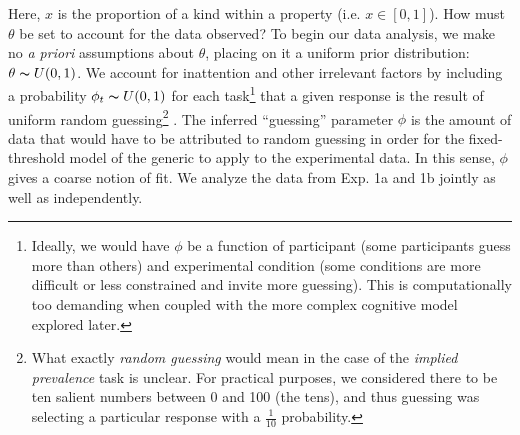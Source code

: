 \documentclass[10pt,letterpaper]{article}
\begin{document}



Here, $x$ is the proportion of a kind within a property (i.e. $x \in [0,1]$). How must $\theta$ be set to account for the data observed? 
To begin our data analysis, we make no \emph{a priori} assumptions about $\theta$, placing on it a uniform prior distribution: $\theta \thicksim U(0,1)$. 
We account for inattention and other irrelevant factors by including a probability $\phi_{t}\thicksim U(0,1)$ for each task\footnote{Ideally, we would have $\phi$ be a function of participant (some participants guess more than others) and experimental condition (some conditions are more difficult or less constrained and invite more guessing). This is computationally too demanding when coupled with the more complex cognitive model explored later.} that a given response is the result of uniform random guessing\footnote{What exactly \emph{random guessing} would mean in the case of the \emph{implied prevalence} task is unclear. For practical purposes, we considered there to be ten salient numbers between 0 and 100 (the tens), and thus guessing was selecting a particular response with a $\frac{1}{10}$ probability.} \cite{LW2014}.
The inferred ``guessing'' parameter $\phi$ is the amount of data that would have to be attributed to random guessing in order for the fixed-threshold model of the generic to apply to the experimental data. In this sense, $\phi$ gives a coarse notion of fit. 
We analyze the data from Exp. 1a and 1b jointly as well as independently.


%
\end{document}
